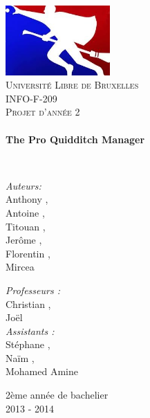 \begin{titlepage}

\begin{center}

\includegraphics[width=0.3\textwidth]{./logo}~\\[1cm]

\textsc{\LARGE Université Libre de Bruxelles}\\[1.5cm]

\textsc{\Large INFO-F-209}\\[0.5cm]
\textsc{\Large Projet d'année 2}\\[0.5cm]

\HRule \\[0.4cm]
{ \huge \bfseries The Pro Quidditch Manager \\[0.4cm] }

\HRule \\[1.5cm]

\begin{minipage}{0.4\textwidth}
\begin{flushleft} \large
\emph{Auteurs:}\\
Anthony ,\\
Antoine ,\\
Titouan ,\\
Jerôme ,\\
Florentin ,\\
Mircea \\
\end{flushleft}
\end{minipage}
\begin{minipage}{0.4\textwidth}
\begin{flushright} \large
\emph{Professeurs :}\\
Christian ,\\
Joël \\[0.5cm]
\emph{Assistants :} \\
Stéphane ,\\
Naïm ,\\
Mohamed Amine \\
\end{flushright}
\end{minipage}

\vfill

{\large 2ème année de bachelier}\\
{\large 2013 - 2014}

\end{center}
	
\end{titlepage}